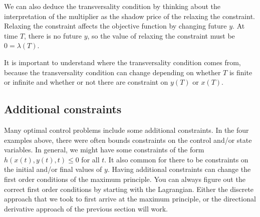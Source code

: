 We can also deduce the transversality condition by thinking about the
interpretation of the multiplier as the shadow price of the relaxing
the constraint. Relaxing the constraint affects the objective function
by changing future $y$. At time $T$, there is no future $y$, so the
value of relaxing the constraint must be $0=\lambda(T)$. 

It is important to understand where the transversality condition comes
from, because the transversality condition can change depending on
whether $T$ is finite or infinite and whether or not there are
constraint on $y(T)$ or $x(T)$. 

\subsection{Additional constraints \label{sec:constraints}}

Many optimal control problems include some additional constraints. In
the four examples above, there were often bounds constraints on the
control and/or state variables. In general, we might have some
constraints of the form $h(x(t),y(t), t) \leq 0$ for all $t$. It also
common for there to be constraints on the initial and/or final values
of $y$. Having additional constraints can change the first order
conditions of the maximum principle. You can always figure out the
correct first order conditions by starting with the Lagrangian. Either
the discrete approach that we took to first arrive at the maximum
principle, or the directional derivative approach of the previous
section will work. 


